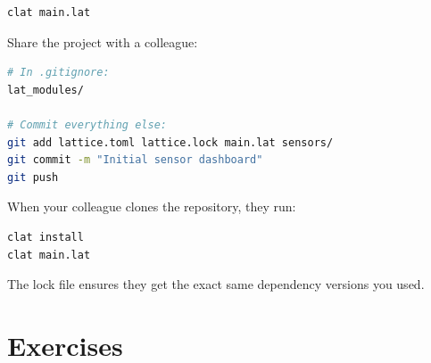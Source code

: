 \begin{lstlisting}[language=bash, numbers=none]
clat main.lat
\end{lstlisting}

Share the project with a colleague:

\begin{lstlisting}[language=bash, numbers=none]
# In .gitignore:
lat_modules/

# Commit everything else:
git add lattice.toml lattice.lock main.lat sensors/
git commit -m "Initial sensor dashboard"
git push
\end{lstlisting}

When your colleague clones the repository, they run:

\begin{lstlisting}[language=bash, numbers=none]
clat install
clat main.lat
\end{lstlisting}

The lock file ensures they get the exact same dependency versions you used.

\section{Exercises}\label{sec:ch29-exercises}

